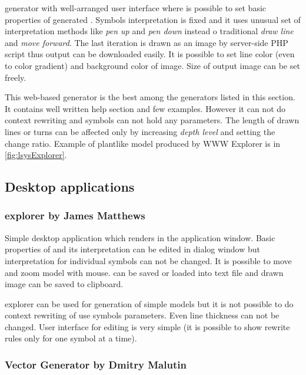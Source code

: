 \noindent
\lsystem generator with well-arranged user interface where is possible to set basic properties of generated \lsystem.
Symbols interpretation is fixed and it uses unusual set of interpretation methods like \emph{pen up} and \emph{pen down} instead o traditional \emph{draw line} and \emph{move forward}.
The last iteration is drawn as an image by server-side PHP script thus output can be downloaded easily.
It is possible to set line color (even to color gradient) and background color of image.
Size of output image can be set freely.

This web-based generator is the best among the generators listed in this section.
It contains well written help section and few examples.
However it can not do context rewriting and symbols can not hold any parameters.
The length of drawn lines or turns can be affected only by increasing \emph{depth level} and setting the change ratio.
Example of plantlike model produced by WWW \lsystem Explorer is in \autoref{fig:lsysExplorer}.




\subsection{Desktop applications}
\label{sec:DesktopGenerators}

\subsubsection{\lsystems explorer by James Matthews}
\label{sec:LsystemExplorer}

\noindent
Simple desktop application which renders \lsystems in the application window.
Basic properties of \lsystem and its interpretation can be edited in dialog window but interpretation for individual symbols can not be changed.
It is possible to move and zoom model with mouse.
\lsystems can be saved or loaded into text file and drawn image can be saved to clipboard.

\lsystems explorer can be used for generation of simple models but it is not possible to do context rewriting of use symbols parameters.
Even line thickness can not be changed.
User interface for editing \lsystem is very simple (it is possible to show rewrite rules only for one symbol at a time).


\subsubsection{\lsystem Vector Generator by Dmitry Malutin}


